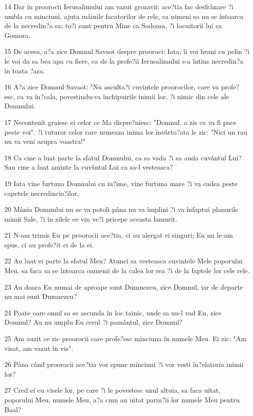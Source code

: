 \par 14 Dar în proorocii Ierusalimului am vazut grozavii: ace?tia fac desfrânare ?i umbla cu minciuni, ajuta mâinile facatorilor de rele, ca nimeni sa nu se întoarca de la necredin?a sa; to?i sunt pentru Mine ca Sodoma, ?i locuitorii lui ca Gomora.
\par 15 De aceea, a?a zice Domnul Savaot despre prooroci: Iata, îi voi hrani cu pelin ?i le voi da sa bea apa cu fiere, ca de la profe?ii Ierusalimului s-a întins necredin?a în toata ?ara.
\par 16 A?a zice Domnul Savaot: "Nu asculta?i cuvintele proorocilor, care va profe?esc, ca va în?eala, povestindu-va închipuirile inimii lor, ?i nimic din cele ale Domnului.
\par 17 Necontenit graiesc ei celor ce Ma dispre?uiesc: "Domnul, a zis ca va fi pace peste voi". ?i tuturor celor care urmeaza inima lor învârto?ata le zic: "Nici un rau nu va veni asupra voastra!"
\par 18 Ca cine a luat parte la sfatul Domnului, ca sa vada ?i sa auda cuvântul Lui? Sau cine a luat aminte la cuvântul Lui ca sa-l vesteasca?
\par 19 Iata vine furtuna Domnului cu iu?ime, vine furtuna mare ?i va cadea peste capetele necredincio?ilor.
\par 20 Mânia Domnului nu se va potoli pâna nu va împlini ?i va înfaptui planurile inimii Sale, ?i în zilele ce vin ve?i pricepe aceasta lamurit.
\par 21 N-am trimis Eu pe proorocii ace?tia, ci au alergat ei singuri; Eu nu le-am spus, ci au profe?it ei de la ei.
\par 22 Au luat ei parte la sfatul Meu? Atunci sa vesteasca cuvintele Mele poporului Meu, sa faca sa se întoarca oamenii de la calea lor rea ?i de la faptele lor cele rele.
\par 23 Au doara Eu numai de aproape sunt Dumnezeu, zice Domnul, iar de departe nu mai sunt Dumnezeu?
\par 24 Poate oare omul sa se ascunda în loc tainic, unde sa nu-l vad Eu, zice Domnul? Au nu umplu Eu cerul ?i pamântul, zice Domnul?
\par 25 Am auzit ce zic proorocii care profe?esc minciuna în numele Meu. Ei zic: "Am visat, am vazut în vis".
\par 26 Pâna când proorocii ace?tia vor spune minciuni ?i vor vesti în?elatoria inimii lor?
\par 27 Cred ei cu visele lor, pe care ?i le povestesc unul altuia, sa faca uitat, poporului Meu, numele Meu, a?a cum au uitat parin?ii lor numele Meu pentru Baal?
